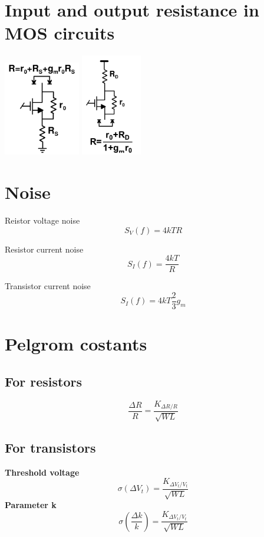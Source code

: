 \section{Input and output resistance in MOS circuits}

\centering
\includegraphics[width=0.25\textwidth]{dres.png}
\includegraphics[width=0.2\textwidth]{sres.png}\\
\raggedright

\section{Noise}

Reistor voltage noise
\begin{equation}
S_V(f)=4kTR
\end{equation}

Resistor current noise
\begin{equation}
S_I(f)=\frac{4kT}{R}
\end{equation}

Transistor current noise
\begin{equation}
S_I(f)=4kT \frac{2}{3} g_m
\end{equation}


\section{Pelgrom costants}

\subsection{For resistors}
\begin{equation}
\frac{\Delta R}{R}=\frac{K_{\Delta R / R}}{\sqrt{WL}}
\end{equation}
\subsection{For transistors}
{\bf Threshold voltage}\\
\begin{equation}
\sigma(\Delta V_t)=\frac{K_{\Delta V_t / V_t}}{\sqrt{WL}}
\end{equation}
{\bf Parameter k}\\
\begin{equation}
\sigma(\frac{\Delta k}{k})=\frac{K_{\Delta V_t / V_t}}{\sqrt{WL}}
\end{equation}

